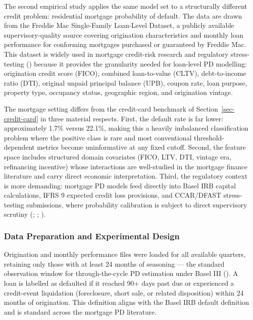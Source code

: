 \documentclass[
  letterpaper,
  DIV=11,
  numbers=noendperiod]{scrartcl}
\begin{document}
The second empirical study applies the same model set to a structurally
different credit problem: residential mortgage probability of default.
The data are drawn from the Freddie Mac Single-Family Loan-Level
Dataset, a publicly available supervisory-quality source covering
origination characteristics and monthly loan performance for conforming
mortgages purchased or guaranteed by Freddie Mac. This dataset is widely
used in mortgage credit-risk research and regulatory stress-testing
() because it provides the granularity needed for loan-level PD
modelling: origination credit score (FICO), combined loan-to-value
(CLTV), debt-to-income ratio (DTI), original unpaid principal balance
(UPB), coupon rate, loan purpose, property type, occupancy status,
geographic region, and origination vintage.

The mortgage setting differs from the credit-card benchmark of
Section~\ref{sec-credit-card} in three material respects. First, the
default rate is far lower: approximately 1.7\% versus 22.1\%, making
this a heavily imbalanced classification problem where the positive
class is rare and most conventional threshold-dependent metrics become
uninformative at any fixed cutoff. Second, the feature space includes
structured domain covariates (FICO, LTV, DTI, vintage era, refinancing
incentive) whose interactions are well-studied in the mortgage finance
literature and carry direct economic interpretation. Third, the
regulatory context is more demanding: mortgage PD models feed directly
into Basel IRB capital calculations, IFRS 9 expected credit loss
provisions, and CCAR/DFAST stress-testing submissions, where probability
calibration is subject to direct supervisory scrutiny
(;
; ).

\subsubsection{Data Preparation and Experimental
Design}\label{sec-fm-data}

Origination and monthly performance files were loaded for all available
quarters, retaining only those with at least 24 months of seasoning ---
the standard observation window for through-the-cycle PD estimation
under Basel III (). A loan is labelled as defaulted if it reached
90+ days past due or experienced a credit-event liquidation
(foreclosure, short sale, or related disposition) within 24 months of
origination. This definition aligns with the Basel IRB default
definition and is standard across the mortgage PD literature.
\end{document}
